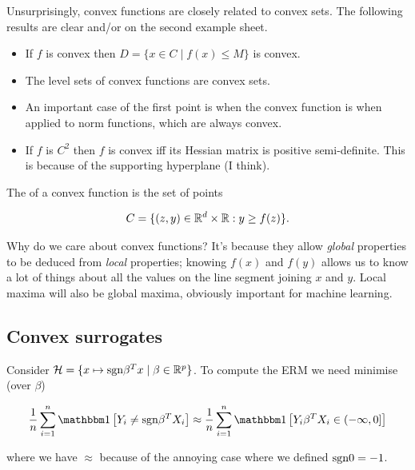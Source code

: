 \documentclass[11pt]{scrartcl}
\begin{document}
\begin{example}
Unsurprisingly, convex functions are closely related to convex sets. The following results are clear and/or on the second example sheet.
\begin{itemize}
    \item If $f$ is convex then $D = \{ x \in C \mid f(x) \le M \}$ is convex.
    \item The level sets of convex functions are convex sets.
    \item An important case of the first point is when the convex function is when applied to norm functions, which are always convex.
    \item If $f$ is $C^2$ then $f$ is convex iff its Hessian matrix is positive semi-definite. This is because of the supporting hyperplane (I think).
\end{itemize}
\end{example}

\begin{definition}
The  of a convex function is the set of points 

\begin{equation}
    C = \{ (z,y) \in \mathbb R^d \times \mathbb R : y \ge f(z) \}.
\end{equation}
\label{epigraph}
\end{definition}

Why do we care about convex functions? It's because they allow \emph{global} properties to be deduced from \emph{local} properties; knowing $f(x)$ and $f(y)$ allows us to know a lot of things about all the values on the line segment joining $x$ and $y$. Local maxima will also be global maxima, obviously important for machine learning. %

\subsection{Convex surrogates}

Consider $\mathcal{H} = \{ x \mapsto \text{sgn} \beta^T x \mid \beta \in \mathbb R^p \}$. To compute the ERM we need minimise (over $\beta$)

\begin{equation}
    \frac1n \sum_{i=1}^n \one{ Y_i \neq \sgn \beta^T X_i } \approx \frac1n \sum_{i=1}^n \one{Y_i \beta^T X_i \in (-\infty, 0]}
\end{equation}

where we have $\approx$ because of the annoying case where we defined $\text{sgn} 0 = -1$.
\end{document}
